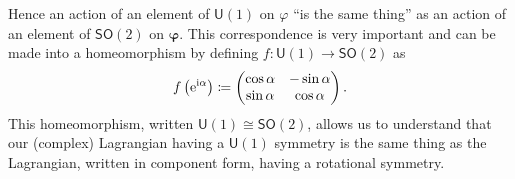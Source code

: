 Hence an action of an element of \(\mathsf{U}(1)\) on \(\varphi\) ``is the same
thing'' as an action of an element of \(\mathsf{SO}(2)\) on \(\pmb{\varphi}\).
This correspondence is very important and can be made into a homeomorphism by
defining \(f:\mathsf{U}(1)\to \mathsf{SO}(2)\) as
\begin{equation}\label{eq:homeo}
    f\left(\mathrm{e}^{\mathrm{i}\alpha}\right)\coloneqq\begin{pmatrix} \cos{\alpha} & -\sin{\alpha} \\ \sin{\alpha} & \cos{\alpha} \end{pmatrix}.
\end{equation}
This homeomorphism, written \(\mathsf{U}(1)\cong \mathsf{SO}(2)\), allows us to
understand that our (complex) Lagrangian having a \(\mathsf{U}(1)\) symmetry is
the same thing as the Lagrangian, written in component form, having a rotational
symmetry.

